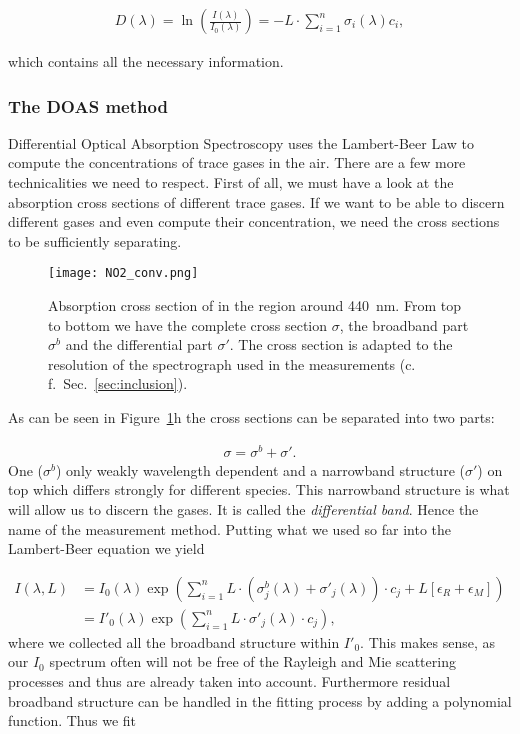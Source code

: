 \begin{align*}
  D(\lambda) = \ln \left(\frac{I(\lambda)}{I_0(\lambda)}\right) = - L
  \cdot \sum_{i=1}^n \sigma_i(\lambda) c_i,
\end{align*}

which contains all the necessary information.

\subsubsection{The DOAS method}
\label{sec:doas}

Differential Optical Absorption Spectroscopy uses the Lambert-Beer Law
to compute the concentrations of trace gases in the air. There are a
few more technicalities we need to respect. First of all, we must have
a look at the absorption cross sections of different trace gases. If we
want to be able to discern different gases and even compute their
concentration, we need the cross sections to be sufficiently
separating.

\begin{figure}[htbp]
  \centering
  \texttt{[image: NO2\_conv.png]}
  \caption{Absorption cross section of  in the region around
    \SI{440}{\nano\meter}. From top to bottom we have the complete
    cross section $\sigma$, the broadband part $\sigma^b$ and the
    differential part $\sigma'$. The cross section is adapted to the
    resolution of the spectrograph used in the measurements
    (c.\,f.\ Sec.~\ref{sec:inclusion}).}
  \label{fig:no2-cross}
\end{figure}


As can be seen in Figure~\ref{fig:no2-cross}h the
cross sections can be separated into two parts: 

\begin{align*}
  \sigma = \sigma^b + \sigma'.
\end{align*}
One ($\sigma^b$) only weakly
wavelength dependent and a narrowband
structure ($\sigma'$) on top which differs strongly for different species. This
narrowband structure is what will allow us to discern the gases. It is
called the \emph{differential band}. Hence the name of the measurement
method. Putting what we used so far into the Lambert-Beer equation we
yield

\begin{align*}
  I(\lambda, L) & = I_0(\lambda) \exp \left ( \sum_{i=1}^n L \cdot
                  (\sigma^b_j(\lambda) + \sigma'_j(\lambda))\cdot c_j + L[\epsilon_R +
                  \epsilon_M]\right) \\
                & = I'_0(\lambda) \exp \left( \sum_{i=1}^n L \cdot
                  \sigma'_j(\lambda) \cdot c_j \right),
\end{align*}
where we collected all the broadband structure within $I'_0$. This
makes sense, as our $I_0$ spectrum often will not be free of the Rayleigh
and Mie scattering processes and thus are already taken into
account. Furthermore residual broadband structure can be handled in
the fitting process by adding a polynomial function. Thus we fit

